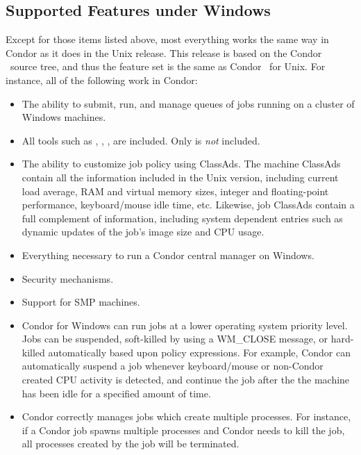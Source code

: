 \subsection{Supported Features under Windows}

Except for those items listed above, most everything works
the same way in Condor as it does in the Unix release.
This release is based on the Condor \VersionNotice\ source tree, and thus the
feature set is the same as Condor \VersionNotice\ for Unix.  
For instance, all of the following work in Condor:
\begin{itemize}

\item The ability to submit, run, and manage queues of jobs running on a
cluster of Windows machines.

\item All tools such as , , ,
are included. Only  is
\emph{not} included.

\item The ability to customize job policy using ClassAds.
The machine ClassAds contain all the information included in the Unix version,
including current load average, RAM and virtual memory sizes, integer and
floating-point performance, keyboard/mouse idle time, etc.  Likewise, job
ClassAds contain a full complement of information, including system
dependent entries such as dynamic updates of the job's image size and CPU
usage.

\item Everything necessary to run a Condor central manager on Windows.

\item Security mechanisms.

\item Support for SMP machines.

\item Condor for Windows can run jobs at a lower operating system
priority level.
Jobs can be suspended, soft-killed by using a WM\_CLOSE message,
or hard-killed automatically based upon policy expressions.
For example, Condor can automatically suspend a job
whenever keyboard/mouse or non-Condor created CPU activity is detected, and
continue the job after the the machine has been idle for a specified amount
of time.

\item Condor correctly manages jobs which create multiple processes.  For
instance, if a Condor job spawns multiple processes and Condor
needs to kill the job,
all processes created by the job will be terminated.


\end{itemize}
